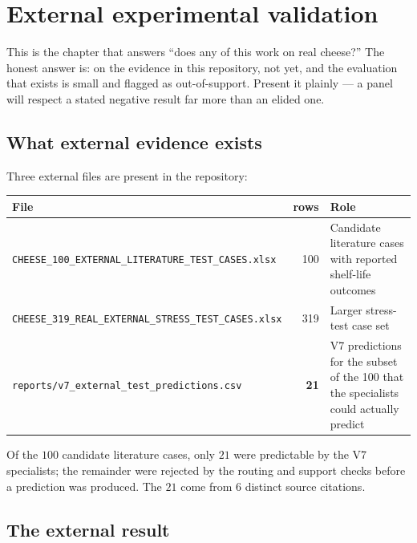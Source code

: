 \chapter{External experimental validation}
\label{ch:external}

\begin{saybox}[title={What to say at the start of this section}]
This is the chapter that answers ``does any of this work on real cheese?''
The honest answer is: on the evidence in this repository, not yet, and the
evaluation that exists is small and flagged as out-of-support. Present it
plainly --- a panel will respect a stated negative result far more than an
elided one.
\end{saybox}

\section{What external evidence exists}

Three external files are present in the repository:

\begin{center}\small
\begin{tabular}{lrp{6.0cm}}
\toprule
File & rows & Role \\
\midrule
\texttt{CHEESE\_100\_EXTERNAL\_LITERATURE\_TEST\_CASES.xlsx} & 100 &
Candidate literature cases with reported shelf-life outcomes \\
\texttt{CHEESE\_319\_REAL\_EXTERNAL\_STRESS\_TEST\_CASES.xlsx} & 319 &
Larger stress-test case set \\
\texttt{reports/v7\_external\_test\_predictions.csv} & \textbf{21} &
V7 predictions for the subset of the 100 that the specialists could
actually predict \\
\bottomrule
\end{tabular}
\end{center}

Of the $100$ candidate literature cases, only $21$ were predictable by the
V7 specialists; the remainder were rejected by the routing and support
checks before a prediction was produced. The $21$ come from $6$ distinct
source citations.

\section{The external result}

